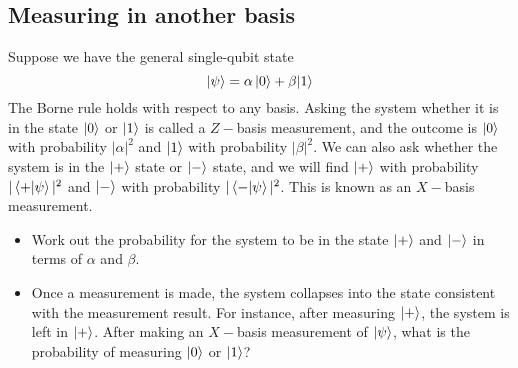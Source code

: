\documentclass{article}
\begin{document}
\subsection*{Measuring in another basis}
Suppose we have the general single-qubit state
$$
\ket{\psi} = \alpha \ket{0} + \beta{\ket 1}
$$
The Borne rule holds with respect to any basis. Asking the system whether it is in the state $\ket{0}$ or $\ket{1}$ is called a $Z-$basis measurement, and the outcome is $\ket{0}$ with probability $|\alpha|^2$ and $\ket{1}$ with probability $|\beta|^2$. We can also ask whether the system is in the $\ket{+}$ state or $\ket{-}$ state, and we will find $\ket{+}$ with probability $|\braket{+}{\psi}|^2$ and $\ket{-}$ with probability $|\braket{-}{\psi}|^2$. This is known as an $X-$basis measurement.
\begin{itemize}
\item Work out the probability for the system to be in the state $\ket{+}$ and $\ket{-}$ in terms of $\alpha$ and $\beta$.
\item Once a measurement is made, the system collapses into the state consistent with the measurement result. For instance, after measuring $\ket{+}$, the system is left in $\ket{+}$. After making an $X-$basis measurement of $\ket{\psi}$, what is the probability of measuring $\ket{0}$ or $\ket{1}$?
\end{itemize}
\end{document}
